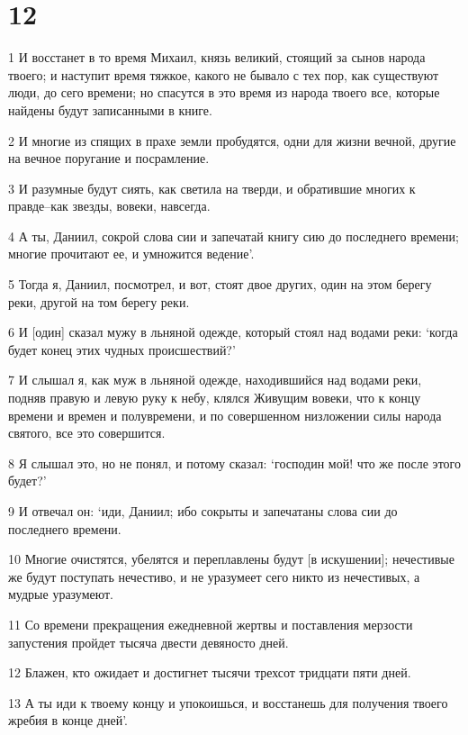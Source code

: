 \chapter{12}

\par 1 И восстанет в то время Михаил, князь великий, стоящий за сынов народа твоего; и наступит время тяжкое, какого не бывало с тех пор, как существуют люди, до сего времени; но спасутся в это время из народа твоего все, которые найдены будут записанными в книге.
\par 2 И многие из спящих в прахе земли пробудятся, одни для жизни вечной, другие на вечное поругание и посрамление.
\par 3 И разумные будут сиять, как светила на тверди, и обратившие многих к правде--как звезды, вовеки, навсегда.
\par 4 А ты, Даниил, сокрой слова сии и запечатай книгу сию до последнего времени; многие прочитают ее, и умножится ведение'.
\par 5 Тогда я, Даниил, посмотрел, и вот, стоят двое других, один на этом берегу реки, другой на том берегу реки.
\par 6 И [один] сказал мужу в льняной одежде, который стоял над водами реки: `когда будет конец этих чудных происшествий?'
\par 7 И слышал я, как муж в льняной одежде, находившийся над водами реки, подняв правую и левую руку к небу, клялся Живущим вовеки, что к концу времени и времен и полувремени, и по совершенном низложении силы народа святого, все это совершится.
\par 8 Я слышал это, но не понял, и потому сказал: `господин мой! что же после этого будет?'
\par 9 И отвечал он: `иди, Даниил; ибо сокрыты и запечатаны слова сии до последнего времени.
\par 10 Многие очистятся, убелятся и переплавлены будут [в искушении]; нечестивые же будут поступать нечестиво, и не уразумеет сего никто из нечестивых, а мудрые уразумеют.
\par 11 Со времени прекращения ежедневной жертвы и поставления мерзости запустения пройдет тысяча двести девяносто дней.
\par 12 Блажен, кто ожидает и достигнет тысячи трехсот тридцати пяти дней.
\par 13 А ты иди к твоему концу и упокоишься, и восстанешь для получения твоего жребия в конце дней'.


